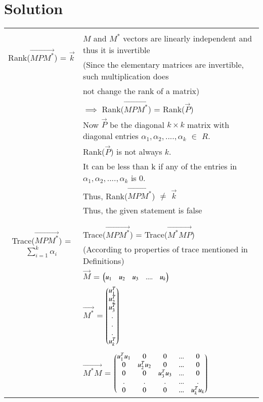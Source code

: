\documentclass[journal,12pt]{IEEEtran}
\begin{document}
\section{\textbf{Solution}}
\renewcommand{\thetable}{2}
\begin{longtable}{|c|l|}
    \hline
	\multirow{3}{*}{Rank($\vec{MP{M}^*}$) = $\vec{k}$} 
	& \\
	& $M$ and $M^*$ vectors are linearly independent and thus it is invertible\\
	& (Since the elementary matrices are invertible, such multiplication does\\
	& not change the rank of a matrix)\\
	& $\implies$ Rank($\vec{MP{M}^*}$) = Rank($\vec{P}$) \\
	& Now $\vec{P}$ be the diagonal $k \times k$ matrix with diagonal entries $\alpha_1,\alpha_2,....,\alpha_k$ $\in$ $R$.\\
	& Rank($\Vec{P}$) is not always $k$. \\
	& It can be less than k if any of the entries in $\alpha_1,\alpha_2,....,\alpha_k$ is 0.\\
	& Thus, Rank($\vec{MP{M}^*}$) $\ne$ $\vec{k}$\\
	& Thus, the given statement is false\\
	&\\
	\hline
	\multirow{3}{*}{Trace($\vec{MP{M}^*}$) = $\sum_{i=1}^{k}\alpha_i$} & \\
	& Trace($\vec{MP{M}^*}$) = Trace($\vec{{M}^*MP}$)\\
	& (According to properties of trace mentioned in Definitions)\\
	& $\vec{M}$ = $\begin{pmatrix}u_1&u_2&u_3&....&u_k\end{pmatrix}$ \\
	& $\vec{M^*}$ = $\begin{pmatrix}u_1^T\\u_2^T\\u_3^T\\.\\.\\.\\u_k^T\end{pmatrix}$ \\
	&\\
	& $\vec{M^*M}$ = $\begin{pmatrix}u_1^Tu_1&0&0&...&0\\
	                           0&u_2^Tu_2&0&...&0\\
	                           0&0&u_3^Tu_3&...&0\\
	                           .&.&.&...&.\\
	                           0&0&0&...&u_k^Tu_k\end{pmatrix}$\\

\end{longtable}
\end{document}
